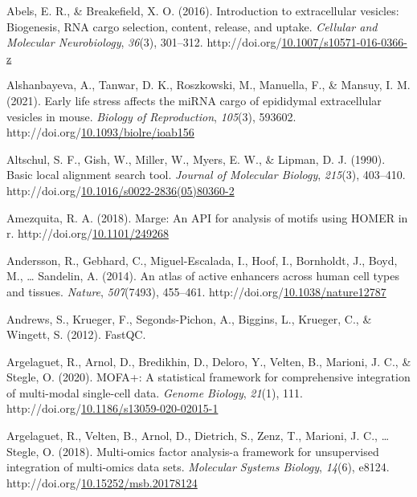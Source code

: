 \documentclass[12pt,twoside]{reedthesis}
\newlength{\cslhangindent}
\newenvironment{CSLReferences}[2] %
 {%
  \setlength{\parindent}{0pt}
  \ifodd #1 \everypar{\setlength{\hangindent}{\cslhangindent}}\ignorespaces\fi
  \ifnum #2 > 0
  \setlength{\parskip}{#2\baselineskip}
  \fi
 }%
 {}
\begin{document}
\hypertarget{refs}{}
\begin{CSLReferences}{1}{0}
\leavevmode{}%
Abels, E. R., \& Breakefield, X. O. (2016). Introduction to extracellular vesicles: Biogenesis, RNA cargo selection, content, release, and uptake. \emph{Cellular and Molecular Neurobiology}, \emph{36}(3), 301--312. http://doi.org/\href{https://doi.org/10.1007/s10571-016-0366-z}{10.1007/s10571-016-0366-z}

\leavevmode{}%
Alshanbayeva, A., Tanwar, D. K., Roszkowski, M., Manuella, F., \& Mansuy, I. M. (2021). Early life stress affects the miRNA cargo of epididymal extracellular vesicles in mouse{\textdagger}. \emph{Biology of Reproduction}, \emph{105}(3), 593602. http://doi.org/\href{https://doi.org/10.1093/biolre/ioab156}{10.1093/biolre/ioab156}

\leavevmode{}%
Altschul, S. F., Gish, W., Miller, W., Myers, E. W., \& Lipman, D. J. (1990). Basic local alignment search tool. \emph{Journal of Molecular Biology}, \emph{215}(3), 403--410. http://doi.org/\href{https://doi.org/10.1016/s0022-2836(05)80360-2}{10.1016/s0022-2836(05)80360-2}

\leavevmode{}%
Amezquita, R. A. (2018). Marge: An API for analysis of motifs using HOMER in r. http://doi.org/\href{https://doi.org/10.1101/249268}{10.1101/249268}

\leavevmode{}%
Andersson, R., Gebhard, C., Miguel-Escalada, I., Hoof, I., Bornholdt, J., Boyd, M., \ldots{} Sandelin, A. (2014). An atlas of active enhancers across human cell types and tissues. \emph{Nature}, \emph{507}(7493), 455--461. http://doi.org/\href{https://doi.org/10.1038/nature12787}{10.1038/nature12787}

\leavevmode{}%
Andrews, S., Krueger, F., Segonds-Pichon, A., Biggins, L., Krueger, C., \& Wingett, S. (2012). FastQC.

\leavevmode{}%
Argelaguet, R., Arnol, D., Bredikhin, D., Deloro, Y., Velten, B., Marioni, J. C., \& Stegle, O. (2020). MOFA+: A statistical framework for comprehensive integration of multi-modal single-cell data. \emph{Genome Biology}, \emph{21}(1), 111. http://doi.org/\href{https://doi.org/10.1186/s13059-020-02015-1}{10.1186/s13059-020-02015-1}

\leavevmode{}%
Argelaguet, R., Velten, B., Arnol, D., Dietrich, S., Zenz, T., Marioni, J. C., \ldots{} Stegle, O. (2018). Multi-omics factor analysis-a framework for unsupervised integration of multi-omics data sets. \emph{Molecular Systems Biology}, \emph{14}(6), e8124. http://doi.org/\href{https://doi.org/10.15252/msb.20178124}{10.15252/msb.20178124}


\end{CSLReferences}
\end{document}
